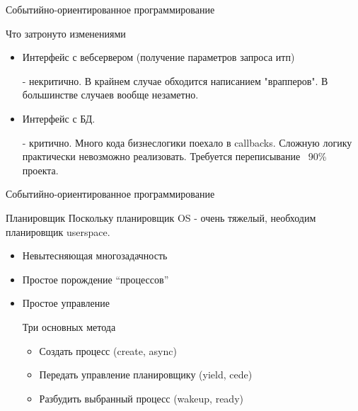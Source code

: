 \documentclass[aspectratio=169]{beamer}
\begin{document}
\begin{frame}{Событийно-ориентированное программирование}
    \begin{block}{Что затронуто изменениями}
        \begin{itemize}
            \pause\item Интерфейс с вебсервером (получение параметров запроса итп)
                \pause\par - некритично.
                    В крайнем случае обходится написанием "врапперов".
                    В большинстве случаев вообще незаметно.
            \pause\item Интерфейс с БД.
                \pause\par - критично. 
                    Много кода бизнеслогики поехало в callbacks. Сложную логику
                    практически невозможно реализовать.
                    Требуется переписывание ~90\% проекта.
        \end{itemize}
    \end{block}
\end{frame}

\begin{frame}{Событийно-ориентированное программирование}
    \begin{block}{Планировщик}
        Поскольку планировщик OS - очень тяжелый, необходим планировщик userspace.
        \begin{itemize}
            \pause\item Невытесняющая многозадачность
            \pause\item Простое порождение ``процессов''
            \pause\item Простое управление
                \pause\par Три основных метода
                \begin{itemize}
                    \pause\item Создать процесс (create, async)
                    \pause\item Передать управление планировщику (yield, cede)
                    \pause\item Разбудить выбранный процесс (wakeup, ready)
                \end{itemize}
        \end{itemize}
    \end{block}
\end{frame}
\end{document}
